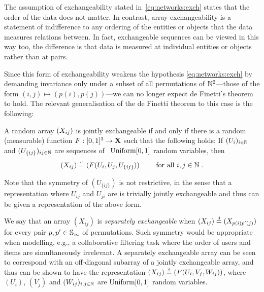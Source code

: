 The assumption of exchangeability stated in~\eqref{eq:networks:exch} states that the order of the data does not matter.
In contrast, array exchangeability is a statement of indifference to any ordering of the entities or objects that the data measures relations between.
In fact, exchangeable sequences can be viewed in this way too, the difference is that data is measured at individual entities or objects rather than at pairs.

Since this form of exchangeability weakens the hypothesis \eqref{eq:networks:exch} by demanding invariance only under a subset of all permutations of $\mathbb{N}^2$---those of the form $(i,j)\mapsto(p(i),p(j))$---we can no longer expect de Finetti's theorem to hold.
The relevant generalisation of the de Finetti theorem to this case is the following:
\begin{thm}
  \label{theorem:ah}
  A random array $(X_{ij})$ is jointly exchangeable if and only if there is a random (measurable) function ${F:[0,1]^3\rightarrow\mathbf{X}}$ such that the following holds: If $(U_i)_{i\in\mathbb{N}}$ and $(U_{\{ij\}})_{ij\in\mathbb{N}}$ are \iid sequences of ~$\mbox{\rm Uniform}[0,1]$ random variables, then
  \begin{equation}
    \label{eq:ah}
    (X_{ij})\stackrel{\mbox{\tiny d}}{=} (F(U_i,U_j,U_{\{ij\}})) \qquad\text{ for all }i,j\in\mathbb{N}\;.
  \end{equation}
\end{thm}

\begin{rem}%
\label{rem:U_ij}
Note that the symmetry of $(U_{\{ij\}})$ is not restrictive, in the sense that a representation where \eg $U_{ij}$ and $U_{ji}$ are \iid is trivially jointly exchangeable and thus can be given a representation of the above form.
\end{rem}
\begin{rem}\label{remsep}
We say that an array $(X_{ij})$ is \emph{separately exchangeable} when $(X_{ij}) \stackrel{\mbox{\tiny d}}{=} (X_{p(i)p'(j)})$ for every pair $p,p' \in \mathbb{S}_{\infty}$ of permutations. 
Such symmetry would be appropriate when modelling, e.g., a collaborative filtering task where the order of users and items are simultaneously irrelevant.
A separately exchangeable array can be seen to correspond with an off-diagonal subarray of a jointly exchangeable array, and thus can be shown to have the representation $(X_{ij}) \stackrel{\mbox{\tiny d}}{=} (F(U_i,V_j,W_{ij}))$, where $(U_i)$, $(V_j)$ and $(W_{ij})_{i,j\in\mathbb{N}}$ are \iid $\mbox{\rm Uniform}[0,1]$ random variables.
\end{rem}

